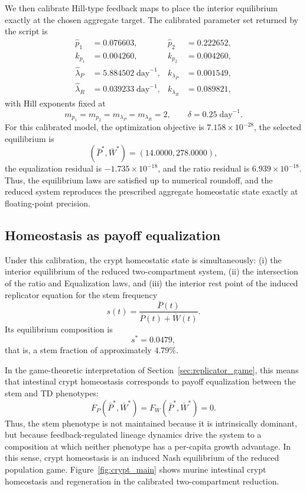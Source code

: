 \documentclass[pdflatex,sn-mathphys-ay]{sn-jnl}
\theoremstyle{thmstyleone}
\theoremstyle{definition}
\theoremstyle{remark}
\begin{document}
We then calibrate Hill-type feedback maps to place the interior equilibrium exactly at
the chosen aggregate target. The calibrated parameter set returned by the script is
\begin{align*}
\hat p_1 &= 0.076603, &
\hat p_2 &= 0.222652, \\
k_{p_1} &= 0.004260, &
k_{p_2} &= 0.004260, \\
\hat\lambda_P &= 5.884502\;\mathrm{day}^{-1}, &
k_{\lambda_P} &= 0.001549, \\
\hat\lambda_R &= 0.039233\;\mathrm{day}^{-1}, &
k_{\lambda_R} &= 0.089821,
\end{align*}
with Hill exponents fixed at
\[
m_{p_1}=m_{p_2}=m_{\lambda_P}=m_{\lambda_R}=2,
\qquad
\delta=0.25\;\mathrm{day}^{-1}.
\]
For this calibrated model, the optimization objective is
$7.158\times10^{-28}$, the selected equilibrium is
\[
(\bar P^*,\bar W^*)=(14.0000,278.0000),
\]
the equalization residual is $-1.735\times10^{-18}$, and the ratio residual is
$6.939\times10^{-18}$. Thus, the equilibrium laws are satisfied up to numerical
roundoff, and the reduced system reproduces the prescribed aggregate homeostatic state
exactly at floating-point precision. 

\subsection{Homeostasis as payoff equalization}
\label{subsec:crypt_nash}

Under this calibration, the crypt homeostatic state is simultaneously:
(i) the interior equilibrium of the reduced two-compartment system,
(ii) the intersection of the ratio and Equalization laws, and
(iii) the interior rest point of the induced replicator equation for the stem frequency
\[
s(t)=\frac{\bar P(t)}{\bar P(t)+\bar W(t)}.
\]
Its equilibrium composition is
\[
s^*=0.0479,
\]
that is, a stem fraction of approximately $4.79\%$.

In the game-theoretic interpretation of Section~\ref{sec:replicator_game}, this means
that intestinal crypt homeostasis corresponds to payoff equalization between the stem
and TD phenotypes:
\[
F_P(\bar P^*,\bar W^*)=F_W(\bar P^*,\bar W^*)=0.
\]
Thus, the stem phenotype is not maintained because it is intrinsically dominant, but
because feedback-regulated lineage dynamics drive the system to a composition at which
neither phenotype has a per-capita growth advantage. In this sense, crypt homeostasis
is an induced Nash equilibrium of the reduced population game.
Figure~\ref{fig:crypt_main} shows murine intestinal crypt homeostasis and regeneration in the calibrated two-compartment reduction.
\end{document}
